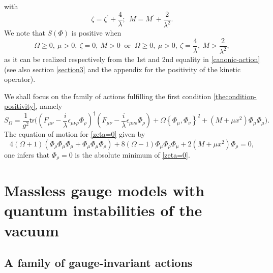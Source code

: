 \documentclass[11pt]{book}
\newcommand{\tr}{\mathsf{tr}}
\theoremstyle{break}
\begin{document}
with
\begin{equation}
\zeta = \zeta^\prime+\frac{4}{\lambda};\ \ M=M^\prime+\frac{2}{\lambda^2}. \label{new-param}
\end{equation}
We note that $S(\Phi)$ is positive when 
\begin{equation}
\Omega\ge0,\ \mu>0,\ \zeta=0,\ M>0
\ \mbox{ or } \ \Omega\ge0,\ \mu>0,\ \zeta=\frac{4}{\lambda},\ M>\frac{2}{\lambda^2}, 
\label{thecondition-positivity}
\end{equation}
%
as it can be realized respectively from the 1st and 2nd equality in \eqref{canonic-action} (see also section \ref{section3} and the appendix for the positivity of the kinetic operator).\par

We shall focus on the family of actions fulfilling the first condition \eqref{thecondition-positivity}, namely
\begin{equation}
S_\Omega = \frac{1}{g^2} \tr\big((F_{\mu\nu} - \frac{i}{\lambda} \epsilon_{\mu\nu\rho} \Phi_\rho)^\dag (F_{\mu\nu} - \frac{i}{\lambda} \epsilon_{\mu\nu\rho} \Phi_\rho) + \Omega\left\{\Phi_\mu,\Phi_\nu\right\}^2 + (M+\mu x^2) \Phi_\mu \Phi_\mu \big) \label{zeta=0}.
\end{equation}
The equation of motion for \eqref{zeta=0} given by
\begin{equation}
4(\Omega+1)(\Phi_\rho\Phi_\mu\Phi_\mu+\Phi_\mu\Phi_\mu\Phi_\rho)+8(\Omega-1)\Phi_\mu\Phi_\rho\Phi_\mu+2(M+\mu x^2) \Phi_\rho = 0\label{eqn-motion},
\end{equation}
one infers that $\Phi_\rho=0$ is the absolute minimum of \eqref{zeta=0}. 

\section*{Massless gauge models with quantum instabilities of the vacuum}









\subsection*{A family of gauge-invariant actions}\label{subsection232}
\end{document}
